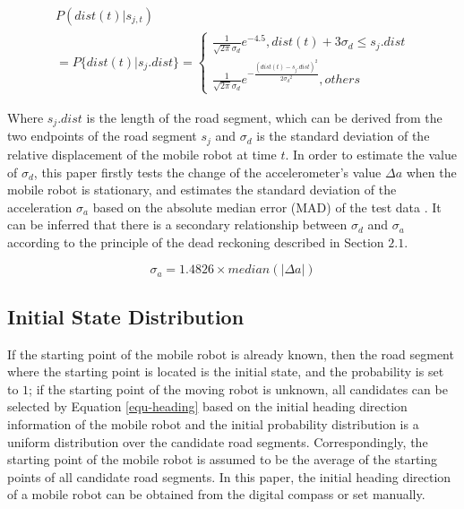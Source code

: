 \documentclass{llncs}
\begin{document}
\begin{equation}
\label{equ-obv-dist}
\begin{array}{l}
P(dist(t)|{s_{j,t}})\\
= P\{ dist(t)|{s_j}.dist\}  = \left\{ {\begin{array}{*{20}{l}}
	{\frac{1}{{\sqrt {2\pi } {\sigma _d}}}{e^{ - 4.5}},dist(t) + 3{\sigma _d} \le {s_j}.dist}\\
	{\frac{1}{{\sqrt {2\pi } {\sigma _d}}}{e^{ - \frac{{{{(dist(t) - {s_j}.dist)}^2}}}{{2{\sigma _d}^2}}}},others}
	\end{array}} \right.
\end{array}
\end{equation}

Where ${s_j}.dist$ is the length of the road segment, which can be derived from the two endpoints of the road segment $s_j$ and $\sigma _d$ is the standard deviation of the relative displacement of the mobile robot at time $t$. In order to estimate the value of $\sigma _d$, this paper firstly tests the change of the accelerometer's value $\Delta a$ when the mobile robot is stationary, and estimates the standard deviation of the acceleration $\sigma_a$ based on the absolute median error (MAD) of the test data \cite{aly2015semmatch}. It can be inferred that there is a secondary relationship between $\sigma _d$ and $\sigma _a$ according to the principle of the dead reckoning described in Section $2.1$.

\begin{equation}
	{\sigma _a} = 1.4826 \times median(\left| {\Delta a} \right|)
\end{equation}

\subsection{Initial State Distribution}

If the starting point of the mobile robot is already known, then the road segment where the starting point is located is the initial state, and the probability is set to $1$; if the starting point of the moving robot is unknown, all candidates can be selected by Equation \ref{equ-heading} based on the initial heading direction information of the mobile robot and the initial probability distribution is a uniform distribution over the candidate road segments. Correspondingly, the starting point of the mobile robot is assumed to be the average of the starting points of all candidate road segments. In this paper, the initial heading direction of a mobile robot can be obtained from the digital compass or set manually.
\end{document}
